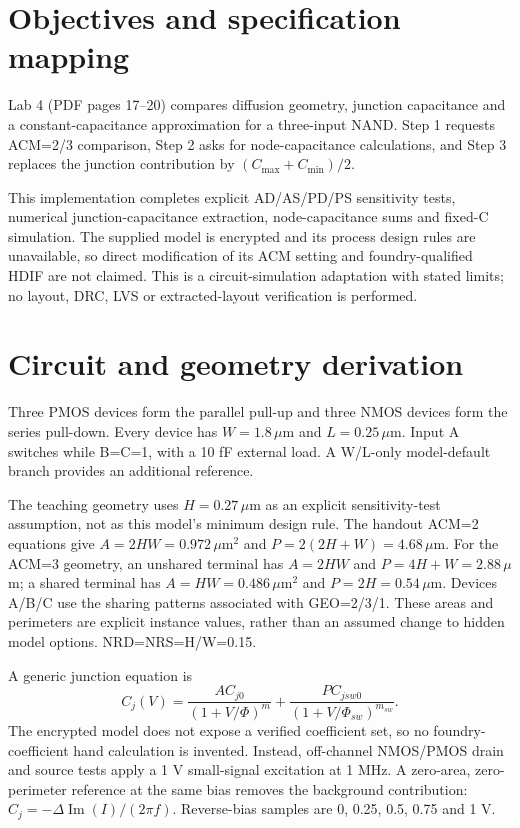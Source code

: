 \section{Objectives and specification mapping}
Lab 4 (PDF pages 17--20) compares diffusion geometry, junction capacitance and a constant-capacitance approximation for a three-input NAND. Step 1 requests ACM=2/3 comparison, Step 2 asks for node-capacitance calculations, and Step 3 replaces the junction contribution by $(C_{\max}+C_{\min})/2$.

This implementation completes explicit AD/AS/PD/PS sensitivity tests, numerical junction-capacitance extraction, node-capacitance sums and fixed-C simulation. The supplied model is encrypted and its process design rules are unavailable, so direct modification of its ACM setting and foundry-qualified HDIF are not claimed. This is a circuit-simulation adaptation with stated limits; no layout, DRC, LVS or extracted-layout verification is performed.

\section{Circuit and geometry derivation}
Three PMOS devices form the parallel pull-up and three NMOS devices form the series pull-down. Every device has $W=1.8\,\mu$m and $L=0.25\,\mu$m. Input A switches while B=C=1, with a 10 fF external load. A W/L-only model-default branch provides an additional reference.

The teaching geometry uses $H=0.27\,\mu$m as an explicit sensitivity-test assumption, not as this model's minimum design rule. The handout ACM=2 equations give $A=2HW=0.972\,\mu$m$^2$ and $P=2(2H+W)=4.68\,\mu$m. For the ACM=3 geometry, an unshared terminal has $A=2HW$ and $P=4H+W=2.88\,\mu$m; a shared terminal has $A=HW=0.486\,\mu$m$^2$ and $P=2H=0.54\,\mu$m. Devices A/B/C use the sharing patterns associated with GEO=2/3/1. These areas and perimeters are explicit instance values, rather than an assumed change to hidden model options. NRD=NRS=H/W=0.15.

A generic junction equation is
\[ C_j(V)=\frac{A C_{j0}}{(1+V/\Phi)^m}+\frac{P C_{jsw0}}{(1+V/\Phi_{sw})^{m_{sw}}}. \]
The encrypted model does not expose a verified coefficient set, so no foundry-coefficient hand calculation is invented. Instead, off-channel NMOS/PMOS drain and source tests apply a 1 V small-signal excitation at 1 MHz. A zero-area, zero-perimeter reference at the same bias removes the background contribution: $C_j=-\Delta\operatorname{Im}(I)/(2\pi f)$. Reverse-bias samples are 0, 0.25, 0.5, 0.75 and 1 V.


